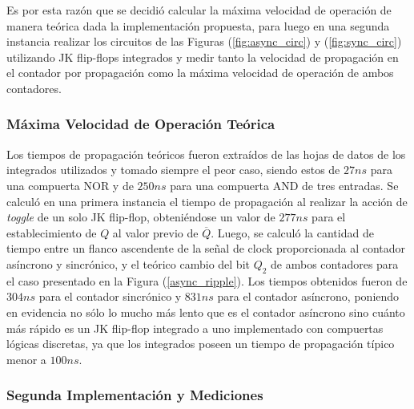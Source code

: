 Es por esta razón que se decidió calcular la máxima velocidad de operación de manera teórica dada la implementación propuesta, para luego en una segunda instancia realizar los circuitos de las Figuras (\ref{fig:async_circ}) y (\ref{fig:sync_circ}) utilizando JK flip-flops integrados y medir tanto la velocidad de propagación en el contador por propagación como la máxima velocidad de operación de ambos contadores.

\subsubsection{Máxima Velocidad de Operación Teórica}

Los tiempos de propagación teóricos fueron extraídos de las hojas de datos de los integrados utilizados y tomado siempre el peor caso, siendo estos de $27ns$ para una compuerta NOR y de $250ns$ para una compuerta AND de tres entradas. Se calculó en una primera instancia el tiempo de propagación al realizar la acción de \textit{toggle} de un solo JK flip-flop, obteniéndose un valor de $277 ns$ para el establecimiento de $Q$ al valor previo de $\overline{Q}$. Luego, se calculó la cantidad de tiempo entre un flanco ascendente de la señal de clock proporcionada al contador asíncrono y sincrónico, y el teórico cambio del bit $Q_2$ de ambos contadores para el caso presentado en la Figura (\ref{async_ripple}). Los tiempos obtenidos fueron de $304 ns$ para el contador sincrónico y $831 ns$ para el contador asíncrono, poniendo en evidencia no sólo lo mucho más lento que es el contador asíncrono sino cuánto más rápido es un JK flip-flop integrado a uno implementado con compuertas lógicas discretas, ya que los integrados poseen un tiempo de propagación típico menor a $100ns$. 

\subsubsection{Segunda Implementación y Mediciones}


